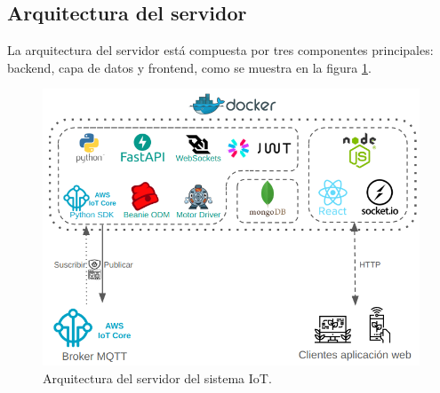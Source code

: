 


\subsection{Arquitectura del servidor}

La arquitectura del servidor está compuesta por tres componentes principales:
backend, capa de datos y frontend, como se muestra en la figura
\ref{fig:arquitectura servidor}.

\begin{figure}[H]
    \centering
    \includegraphics[width=.97\textwidth]{./Images/16.png}
    \caption{Arquitectura del servidor del sistema IoT.}
    \label{fig:arquitectura servidor}
\end{figure}

